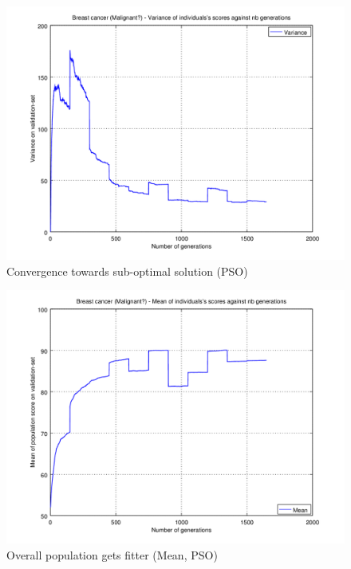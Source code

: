 \documentclass[a4paper,12pt, oneside]{memoir}
\begin{document}
\begin{figure}[h]
  \centering
  \includegraphics[scale=0.7]{malignant-varianceVSepochs-PSO}
  \vspace{-12pt}
  \caption{Convergence towards sub-optimal solution (PSO)}
  \label{malignant-variance-PSO}
\end{figure}

\begin{figure}[h]
  \centering
  \includegraphics[scale=0.7]{malignant-meanVSepochs-PSO}
  \vspace{-12pt}
  \caption{Overall population gets fitter (Mean, PSO)}
  \label{malignant-mean-PSO}
\end{figure}
\end{document}
